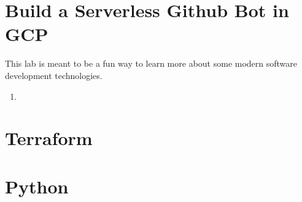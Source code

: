 







\section{\label{sec:Start}Build a Serverless Github Bot in GCP}
\vspace{2mm}

\justifying
This lab is meant to be a fun way to learn more about some modern software development technologies.

\begin{raggedright}
	\begin{enumerate}
		\item 
	\end{enumerate}
\end{raggedright}
\vspace{2mm}

\section{\label{sec:Terraform}Terraform}


\section{\label{sec:Python}Python}

% 
% 


